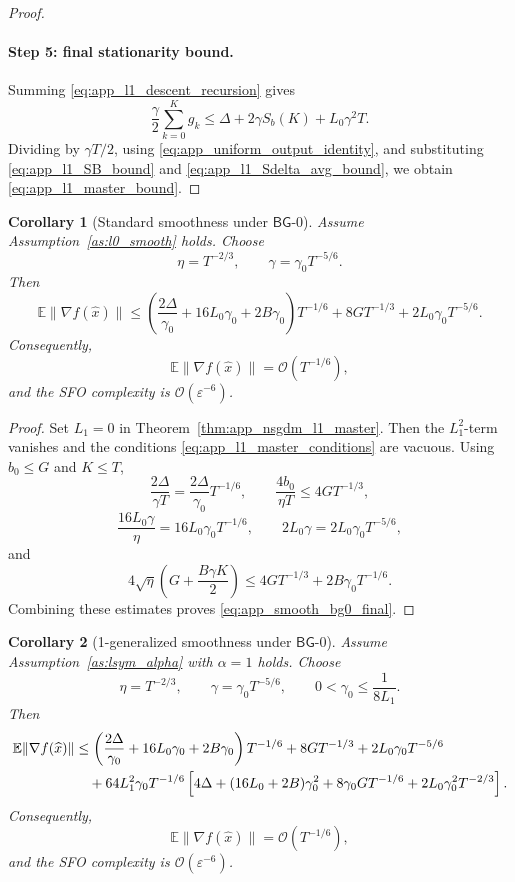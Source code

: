 \documentclass[letter,11pt]{article}
\newtheorem{corollary}{Corollary}[theorem]
\newcommand{\E}{\mathbb{E}}
\newcommand{\Ocal}{\mathcal{O}}
\begin{document}
\begin{proof}
\paragraph{Step 5: final stationarity bound.}
Summing \eqref{eq:app_l1_descent_recursion} gives
\[
    \frac{\gamma}{2}\sum_{k=0}^K g_k
    \le
    \Delta+2\gamma S_b(K)+L_0\gamma^2T.
\]
Dividing by \(\gamma T/2\), using
\eqref{eq:app_uniform_output_identity}, and substituting
\eqref{eq:app_l1_SB_bound} and \eqref{eq:app_l1_Sdelta_avg_bound}, we obtain
\eqref{eq:app_l1_master_bound}.
\end{proof}

\begin{corollary}[Standard smoothness under \(\mathsf{BG}\)-0]
\label{cor:app_nsgdm_smooth_bg0}
Assume Assumption~\ref{as:l0_smooth} holds. Choose
\[
    \eta=T^{-2/3},
    \qquad
    \gamma=\gamma_0T^{-5/6}.
\]
Then
\begin{equation}
\label{eq:app_smooth_bg0_final}
\E\|\nabla f(\widehat x)\|
\le
\left(
    \frac{2\Delta}{\gamma_0}
    +16L_0\gamma_0
    +2B\gamma_0
\right)T^{-1/6}
+8GT^{-1/3}
+2L_0\gamma_0T^{-5/6}.
\end{equation}
Consequently,
\[
    \E\|\nabla f(\widehat x)\|
    =
    \Ocal(T^{-1/6}),
\]
and the SFO complexity is \(\Ocal(\varepsilon^{-6})\).
\end{corollary}

\begin{proof}
Set \(L_1=0\) in Theorem~\ref{thm:app_nsgdm_l1_master}. Then the
\(L_1^2\)-term vanishes and the conditions
\eqref{eq:app_l1_master_conditions} are vacuous. Using \(b_0\le G\) and
\(K\le T\),
\[
    \frac{2\Delta}{\gamma T}
    =
    \frac{2\Delta}{\gamma_0}T^{-1/6},
    \qquad
    \frac{4b_0}{\eta T}
    \le
    4GT^{-1/3},
\]
\[
    \frac{16L_0\gamma}{\eta}
    =
    16L_0\gamma_0T^{-1/6},
    \qquad
    2L_0\gamma
    =
    2L_0\gamma_0T^{-5/6},
\]
and
\[
    4\sqrt\eta
    \left(G+\frac{B\gamma K}{2}\right)
    \le
    4GT^{-1/3}
    +2B\gamma_0T^{-1/6}.
\]
Combining these estimates proves \eqref{eq:app_smooth_bg0_final}.
\end{proof}

\begin{corollary}[1-generalized smoothness under \(\mathsf{BG}\)-0]
\label{cor:app_nsgdm_sym1_bg0}
Assume Assumption~\ref{as:lsym_alpha} with \(\alpha=1\) holds. Choose
\[
    \eta=T^{-2/3},
    \qquad
    \gamma=\gamma_0T^{-5/6},
    \qquad
    0<\gamma_0\le \frac{1}{8L_1}.
\]
Then
\begin{align}
\E\|\nabla f(\widehat x)\|
&\le
\left(
    \frac{2\Delta}{\gamma_0}
    +16L_0\gamma_0
    +2B\gamma_0
\right)T^{-1/6}
+8GT^{-1/3}
+2L_0\gamma_0T^{-5/6}
\notag\\
&\quad
+64L_1^2\gamma_0T^{-1/6}
\left[
    4\Delta
    +(16L_0+2B)\gamma_0^2
    +8\gamma_0G T^{-1/6}
    +2L_0\gamma_0^2T^{-2/3}
\right].
\label{eq:app_sym1_bg0_final}
\end{align}
Consequently,
\[
    \E\|\nabla f(\widehat x)\|
    =
    \Ocal(T^{-1/6}),
\]
and the SFO complexity is \(\Ocal(\varepsilon^{-6})\).
\end{corollary}
\end{document}
